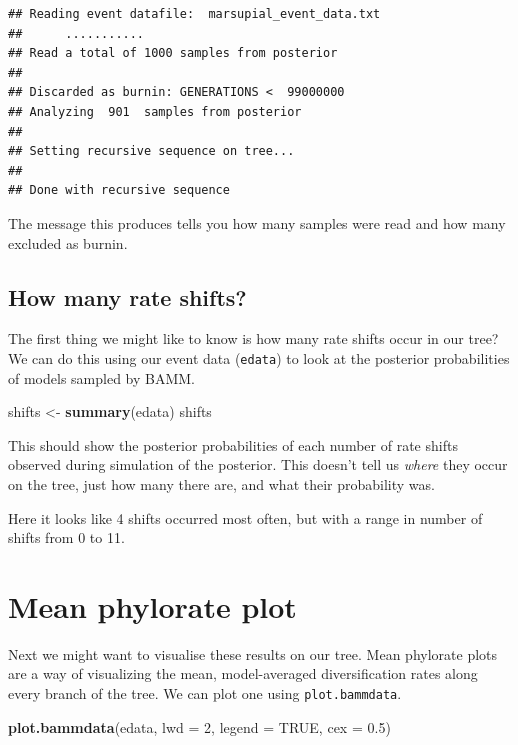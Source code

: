 \documentclass[]{book}
\newenvironment{Shaded}{\begin{snugshade}}{\end{snugshade}}
\newcommand{\KeywordTok}[1]{\textcolor[rgb]{0.13,0.29,0.53}{\textbf{{#1}}}}
\newcommand{\DataTypeTok}[1]{\textcolor[rgb]{0.13,0.29,0.53}{{#1}}}
\newcommand{\DecValTok}[1]{\textcolor[rgb]{0.00,0.00,0.81}{{#1}}}
\newcommand{\FloatTok}[1]{\textcolor[rgb]{0.00,0.00,0.81}{{#1}}}
\newcommand{\StringTok}[1]{\textcolor[rgb]{0.31,0.60,0.02}{{#1}}}
\newcommand{\OtherTok}[1]{\textcolor[rgb]{0.56,0.35,0.01}{{#1}}}
\newcommand{\NormalTok}[1]{{#1}}
\theoremstyle{definition}
\theoremstyle{definition}
\theoremstyle{definition}
\theoremstyle{remark}
\begin{document}
\begin{verbatim}
## Reading event datafile:  marsupial_event_data.txt 
##      ...........
## Read a total of 1000 samples from posterior
## 
## Discarded as burnin: GENERATIONS <  99000000
## Analyzing  901  samples from posterior
## 
## Setting recursive sequence on tree...
## 
## Done with recursive sequence
\end{verbatim}

The message this produces tells you how many samples were read and how
many excluded as burnin.

\subsection{How many rate shifts?}\label{how-many-rate-shifts}

The first thing we might like to know is how many rate shifts occur in
our tree? We can do this using our event data (\texttt{edata}) to look
at the posterior probabilities of models sampled by BAMM.

\begin{Shaded}
\begin{Highlighting}[]
\NormalTok{shifts <-}\StringTok{ }\KeywordTok{summary}\NormalTok{(edata)}
\NormalTok{shifts}
\end{Highlighting}
\end{Shaded}

This should show the posterior probabilities of each number of rate
shifts observed during simulation of the posterior. This doesn't tell us
\emph{where} they occur on the tree, just how many there are, and what
their probability was.

Here it looks like 4 shifts occurred most often, but with a range in
number of shifts from 0 to 11.

\section{Mean phylorate plot}\label{mean-phylorate-plot}

Next we might want to visualise these results on our tree. Mean
phylorate plots are a way of visualizing the mean, model-averaged
diversification rates along every branch of the tree. We can plot one
using \texttt{plot.bammdata}.

\begin{Shaded}
\begin{Highlighting}[]
\KeywordTok{plot.bammdata}\NormalTok{(edata, }\DataTypeTok{lwd =} \DecValTok{2}\NormalTok{, }\DataTypeTok{legend =} \OtherTok{TRUE}\NormalTok{, }\DataTypeTok{cex =} \FloatTok{0.5}\NormalTok{)}
\end{Highlighting}
\end{Shaded}
\end{document}
